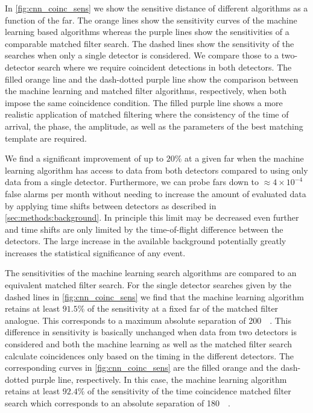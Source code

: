 In \autoref{fig:cnn_coinc_sens} we show the sensitive distance of different algorithms as a function of the \acrshort{far}. The orange lines show the sensitivity curves of the machine learning based algorithms whereas the purple lines show the sensitivities of a comparable matched filter search. The dashed lines show the sensitivity of the searches when only a single detector is considered. We compare those to a two-detector search where we require coincident detections in both detectors. The filled orange line and the dash-dotted purple line show the comparison between the machine learning and matched filter algorithms, respectively, when both impose the same coincidence condition. The filled purple line shows a more realistic application of matched filtering where the consistency of the time of arrival, the phase, the amplitude, as well as the parameters of the best matching template are required.

We find a significant improvement of up to $20\%$ at a given \acrshort{far} when the machine learning algorithm has access to data from both detectors compared to using only data from a single detector. Furthermore, we can probe \acrshort{far}s down to $\approx 4\times 10^{-4}$ false alarms per month without needing to increase the amount of evaluated data by applying time shifts between detectors as described in \autoref{sec:methods:background}. In principle this limit may be decreased even further and time shifts are only limited by the time-of-flight difference between the detectors. The large increase in the available background potentially greatly increases the statistical significance of any event.

The sensitivities of the machine learning search algorithms are compared to an equivalent matched filter search. For the single detector searches given by the dashed lines in \autoref{fig:cnn_coinc_sens} we find that the machine learning algorithm retains at least $91.5\%$ of the sensitivity at a fixed \acrshort{far} of the matched filter analogue. This corresponds to a maximum absolute separation of \SI{200}{\mega\parsec}. This difference in sensitivity is basically unchanged when data from two detectors is considered and both the machine learning as well as the matched filter search calculate coincidences only based on the timing in the different detectors. The corresponding curves in \autoref{fig:cnn_coinc_sens} are the filled orange and the dash-dotted purple line, respectively. In this case, the machine learning algorithm retains at least $92.4\%$ of the sensitivity of the time coincidence matched filter search which corresponds to an absolute separation of \SI{180}{\mega\parsec}.

